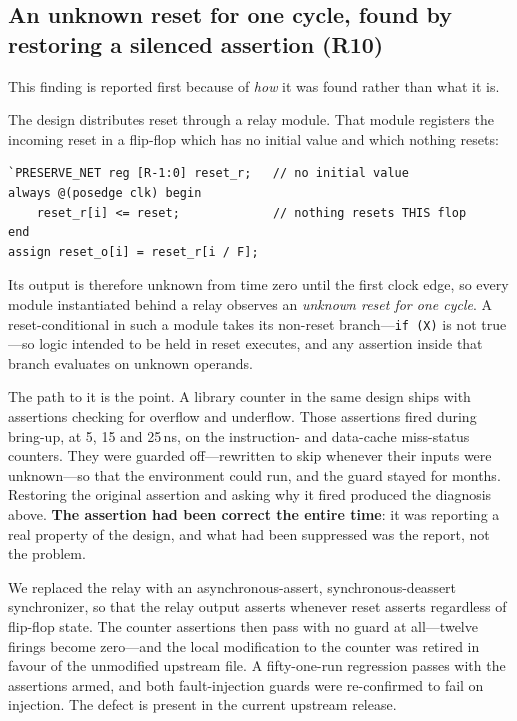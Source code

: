 \documentclass[conference]{IEEEtran}
\newcommand{\code}[1]{\texttt{\small #1}}
\begin{document}
\subsection{An unknown reset for one cycle, found by restoring a
silenced assertion (R10)}
\label{sec:r10}

This finding is reported first because of \emph{how} it was found rather
than what it is.

The design distributes reset through a relay module. That module registers
the incoming reset in a flip-flop which has no initial value and which
nothing resets:

\begin{lstlisting}
`PRESERVE_NET reg [R-1:0] reset_r;   // no initial value
always @(posedge clk) begin
    reset_r[i] <= reset;             // nothing resets THIS flop
end
assign reset_o[i] = reset_r[i / F];
\end{lstlisting}

Its output is therefore unknown from time zero until the first clock edge,
so every module instantiated behind a relay observes an \emph{unknown reset
for one cycle}. A reset-conditional in such a module takes its non-reset
branch---\code{if (X)} is not true---so logic intended to be held in reset
executes, and any assertion inside that branch evaluates on unknown
operands.

The path to it is the point. A library counter in the same design ships
with assertions checking for overflow and underflow. Those assertions fired
during bring-up, at 5, 15 and 25\,ns, on the instruction- and data-cache
miss-status counters. They were guarded off---rewritten to skip whenever
their inputs were unknown---so that the environment could run, and the
guard stayed for months. Restoring the original assertion and asking why it
fired produced the diagnosis above. \textbf{The assertion had been correct
the entire time}: it was reporting a real property of the design, and what
had been suppressed was the report, not the problem.

We replaced the relay with an asynchronous-assert, synchronous-deassert
synchronizer, so that the relay output asserts whenever reset asserts
regardless of flip-flop state. The counter assertions then pass with no
guard at all---twelve firings become zero---and the local modification to
the counter was retired in favour of the unmodified upstream file. A
fifty-one-run regression passes with the assertions armed, and both
fault-injection guards were re-confirmed to fail on injection. The defect
is present in the current upstream release.
\end{document}
